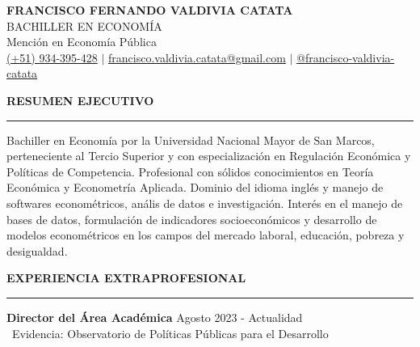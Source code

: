 \documentclass{resume2}
\begin{document}
\begin{center}
	\MakeUppercase{\LARGE \bf Francisco Fernando Valdivia Catata}
	\vspace{2mm} \\
	\MakeUppercase{Bachiller en Economía}
	\vspace{2mm} \\
	Mención en Economía Pública
	\vspace{2mm} \\
	{\color{vino}\faPhoneSquare} {\href{tel:934395428}{(+51) 934-395-428}} $|$
	{\color{vino}\faEnvelopeSquare} {\href{mailto:francisco.valdivia.catata@gmail.com}{francisco.valdivia.catata@gmail.com}} $|$
	{\color{vino}\faLinkedinSquare} {\href{https://www.linkedin.com/in/francisco-valdivia-catata/}{@francisco-valdivia-catata}}
	\vspace{2mm}
\end{center}


{\color{vino} \noindent\MakeUppercase{\large \bf Resumen Ejecutivo} \\
\rule[3mm]{\textwidth}{0.5mm}}

\noindent Bachiller en Economía por la Universidad Nacional Mayor de San Marcos, perteneciente al Tercio Superior
y con especialización en Regulación Económica y Políticas de Competencia.
Profesional con sólidos conocimientos en Teoría Económica y Econometría Aplicada.
Dominio del idioma inglés y manejo de softwares econométricos, anális de datos e investigación.
Interés en el manejo de bases de datos, formulación de indicadores socioeconómicos y desarrollo de modelos econométricos
en los campos del mercado laboral, educación, pobreza y desigualdad.

\vspace{5mm}


{\color{vino} \noindent\MakeUppercase{\large \bf Experiencia Extraprofesional} \\
\rule[3mm]{\textwidth}{0.5mm}}

\noindent {\color{vino} \faBriefcase} \; {\bf Director del Área Académica} \hfill
{\color{vino}\faCalendarCheckO} {Agosto 2023 - Actualidad} \\
{\color{vino}\faInstitution} \, {Evidencia: Observatorio de Políticas Públicas para el Desarrollo}

\vspace{2mm}
\end{document}
